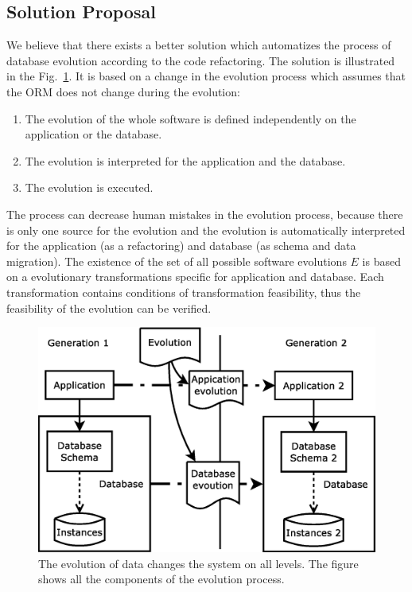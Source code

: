 \documentclass[runningheads]{comsis}
\begin{document}
\subsection{Solution Proposal}
We believe that there exists a better solution which automatizes the process of database evolution according to the code refactoring. The solution is illustrated in the Fig.~\ref{fig:evolution}. It is based on a change in the evolution process which assumes that the ORM does not change during the evolution:
\begin{enumerate}
	\item The evolution of the whole software is defined independently on the application or the database.
	\item The evolution is interpreted for the application and the database.
	\item The evolution is executed.
\end{enumerate}
The process can decrease human mistakes in the evolution process, because there is only one source for the evolution and the evolution is automatically interpreted for the application (as a refactoring) and database (as schema and data migration). The existence of the set of all possible software evolutions $E$ is based on a evolutionary transformations specific for application and database. Each transformation contains conditions of transformation feasibility, thus the feasibility of the evolution can be verified. 

\begin{figure}
\centering
	\includegraphics[width=.7\textwidth]{./images/evolution_simple}
	\caption{The evolution of data changes the system on all levels. The figure shows all the components of the evolution process.}
	\label{fig:evolution}
\end{figure}
\end{document}
